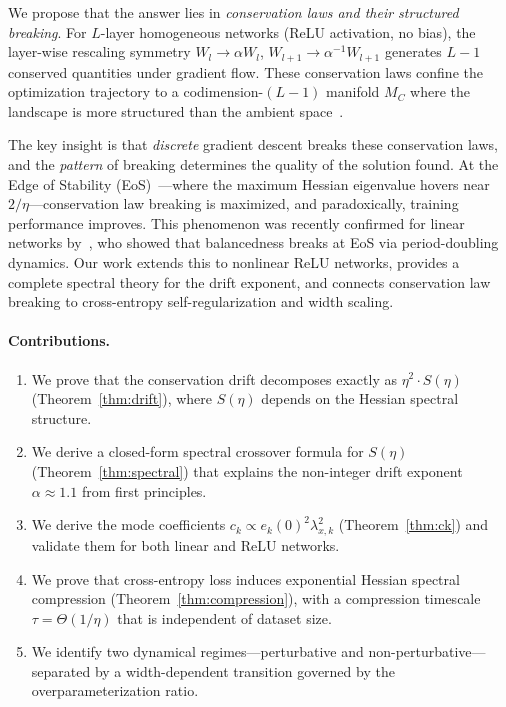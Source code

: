 \documentclass[11pt]{article}
\newcommand{\lr}{\eta}                    %
\newcommand{\drexp}{\alpha}               %
\newcommand{\imbal}{S}                    %
\newcommand{\spectau}{\tau}               %
\theoremstyle{definition}
\theoremstyle{remark}
\begin{document}
We propose that the answer lies in \emph{conservation laws and their structured breaking}. For $L$-layer homogeneous networks (ReLU activation, no bias), the layer-wise rescaling symmetry $W_l \to \alpha W_l$, $W_{l+1} \to \alpha^{-1} W_{l+1}$ generates $L{-}1$ conserved quantities under gradient flow. These conservation laws confine the optimization trajectory to a codimension-$(L{-}1)$ manifold $M_C$ where the landscape is more structured than the ambient space~\citep{kunin2021neural, zhao2023symmetries, marcotte2023conservation}.

The key insight is that \emph{discrete} gradient descent breaks these conservation laws, and the \emph{pattern} of breaking determines the quality of the solution found. At the Edge of Stability (EoS)~\citep{cohen2021gradient}---where the maximum Hessian eigenvalue hovers near $2/\lr$---conservation law breaking is maximized, and paradoxically, training performance improves. This phenomenon was recently confirmed for linear networks by~\citet{ghosh2025learning}, who showed that balancedness breaks at EoS via period-doubling dynamics. Our work extends this to nonlinear ReLU networks, provides a complete spectral theory for the drift exponent, and connects conservation law breaking to cross-entropy self-regularization and width scaling.

\paragraph{Contributions.}
\begin{enumerate}
    \item We prove that the conservation drift decomposes exactly as $\lr^2 \cdot \imbal(\lr)$ (Theorem~\ref{thm:drift}), where $\imbal(\lr)$ depends on the Hessian spectral structure.
    \item We derive a closed-form spectral crossover formula for $\imbal(\lr)$ (Theorem~\ref{thm:spectral}) that explains the non-integer drift exponent $\drexp \approx 1.1$ from first principles.
    \item We derive the mode coefficients $c_k \propto e_k(0)^2 \lambda_{x,k}^2$ (Theorem~\ref{thm:ck}) and validate them for both linear and ReLU networks.
    \item We prove that cross-entropy loss induces exponential Hessian spectral compression (Theorem~\ref{thm:compression}), with a compression timescale $\spectau = \Theta(1/\lr)$ that is independent of dataset size.
    \item We identify two dynamical regimes---perturbative and non-perturbative---separated by a width-dependent transition governed by the overparameterization ratio.
\end{enumerate}
\end{document}
